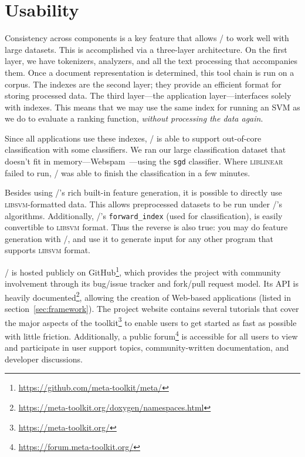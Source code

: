 \section{Usability}

Consistency across components is a key feature that allows \meta/ to work
well with large datasets. This is accomplished via a three-layer architecture.
On the first layer, we have tokenizers, analyzers, and all the text processing
that accompanies them. Once a document representation is determined, this tool
chain is run on a corpus. The indexes are the second layer; they provide an
efficient format for storing processed data. The third layer---the application
layer---interfaces solely with indexes. This means that we may use the same
index for running an SVM as we do to evaluate a ranking function, \emph{without
processing the data again}.

Since all applications use these indexes, \meta/ is able to support out-of-core
classification with some classifiers. We ran our large classification dataset
that doesn't fit in memory---Webspam~\citep{Webb:2006:CEAS}---using the
\texttt{sgd} classifier. Where \textsc{liblinear} failed to run, \meta/ was able
to finish the classification in a few minutes.

Besides using \meta/'s rich built-in feature generation, it is possible to
directly use \textsc{libsvm}-formatted data. This allows preprocessed datasets
to be run under \meta/'s algorithms. Additionally, \meta/'s
\texttt{forward\_index} (used for classification), is easily convertible to
\textsc{libsvm} format. Thus the reverse is also true: you may do feature
generation with \meta/, and use it to generate input for any other program that
supports \textsc{libsvm} format.

\meta/ is hosted publicly on
GitHub\footnote{\url{https://github.com/meta-toolkit/meta/}}, which provides the
project with community involvement through its bug/issue tracker and fork/pull
request model. Its API is heavily
documented\footnote{\url{https://meta-toolkit.org/doxygen/namespaces.html}},
allowing the creation of Web-based applications (listed in
section~\ref{sec:framework}). The project website contains several tutorials
that cover the major aspects of the
toolkit\footnote{\url{https://meta-toolkit.org/}} to enable users to get started
as fast as possible with little friction. Additionally, a public
forum\footnote{\url{https://forum.meta-toolkit.org/}} is accessible for all
users to view and participate in user support topics, community-written
documentation, and developer discussions.

